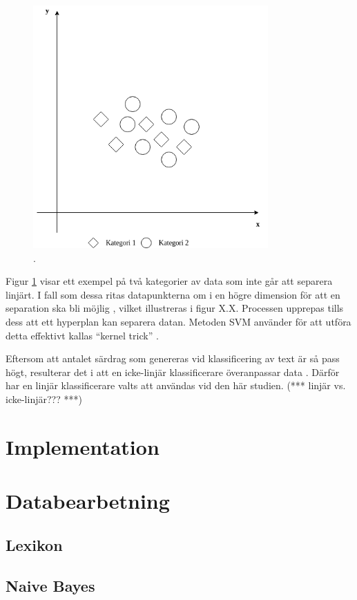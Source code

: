 \documentclass{kaumasters} %
\begin{document}
\begin{figure}[H]
\includegraphics[width=9cm]{nonlinearsvm}
\centering
\caption{.}
\label{fig:svmnonl}
\end{figure} 

Figur \ref{fig:svmnonl} visar ett exempel på två kategorier av data som inte går att separera linjärt. I fall som dessa ritas datapunkterna om i en högre dimension för att en separation ska bli möjlig \cite{svm:003}, vilket illustreras i figur X.X. Processen upprepas tills dess att ett hyperplan kan separera datan. Metoden SVM använder för att utföra detta effektivt kallas “kernel trick” \cite{svm:004}.  

Eftersom att antalet särdrag som genereras vid klassificering av text är så pass högt, resulterar det i att en icke-linjär klassificerare överanpassar data \cite{svm:005}. Därför har en linjär klassificerare valts att användas vid den här studien.
(*** linjär vs. icke-linjär??? ***)



\section{Implementation}\label{impl}
\section{Databearbetning}\label{impl:pre}
\subsection{Lexikon}\label{impl:lex}
\subsection{Naive Bayes}\label{impl:nb}
\end{document}
